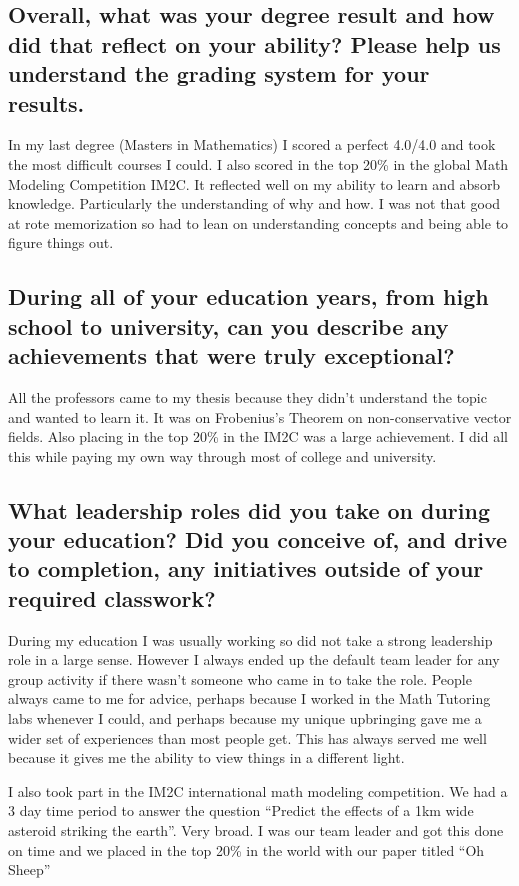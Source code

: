 \documentclass[letter,12pt]{article}
\begin{document}
\subsection{Overall, what was your degree result and how did that reflect on your ability? Please help us understand the grading system for your results.}
In my last degree (Masters in Mathematics) I scored a perfect 4.0/4.0 and took the most difficult courses I could. I also scored in the top 20\% in the global Math Modeling Competition IM2C. It reflected well on my ability to learn and absorb knowledge. Particularly the understanding of why and how. I was not that good at rote memorization so had to lean on understanding concepts and being able to figure things out.

\subsection{During all of your education years, from high school to university,  can you describe any achievements that were truly exceptional?}
All the professors came to my thesis because they didn't understand the topic and wanted to learn it. It was on Frobenius's Theorem on non-conservative vector fields. Also placing in the top 20\% in the IM2C was a large achievement. I did all this while paying my own way through most of college and university.

\subsection{What leadership roles did you take on during your education? Did you conceive of, and drive to completion, any initiatives outside of your required classwork?}
During my education I was usually working so did not take a strong leadership role in a large sense. However I always ended up the default team leader for any group activity if there wasn't someone who came in to take the role. People always came to me for advice, perhaps because I worked in the Math Tutoring labs whenever I could, and perhaps because my unique upbringing gave me a wider set of experiences than most people get. This has always served me well because it gives me the ability to view things in a different light.

I also took part in the IM2C international math modeling competition. We had a 3 day time period to answer the question ``Predict the effects of a 1km wide asteroid striking the earth''. Very broad. I was our team leader and got this done on time and we placed in the top 20\% in the world with our paper titled ``Oh Sheep''
\end{document}
